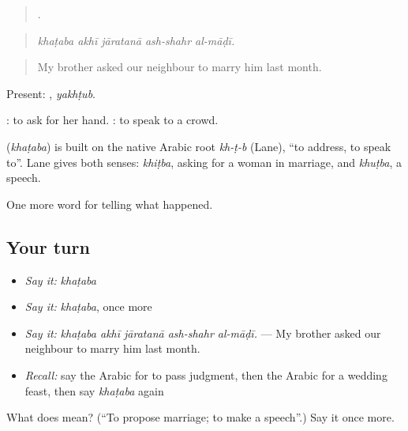 \begin{quote}
    .
\end{quote}

\begin{quote}
\emph{khaṭaba akhī jāratanā ash-shahr al-māḍī.}
\end{quote}

\begin{quote}
My brother asked our neighbour to marry him last month.
\end{quote}

Present: , \emph{yakhṭub}.

 : to ask for her hand.   : to speak to a crowd.

\begin{cousinweb}
\textbf{} (\emph{khaṭaba}) is built on the native Arabic root \emph{kh-ṭ-b} (Lane), \textquotedblleft{}to address, to speak to\textquotedblright{}. Lane gives both senses: \emph{khiṭba}, asking for a woman in marriage, and \emph{khuṭba}, a speech.
\end{cousinweb}

\begin{grammarlens}[title={What you've built}]
One more word for telling what happened.
\end{grammarlens}

\subsection*{Your turn}
\begin{itemize}
\raggedright
  \item \emph{Say it:} \emph{khaṭaba}
  \item \emph{Say it:} \emph{khaṭaba}, once more
  \item \emph{Say it:} \emph{khaṭaba akhī jāratanā ash-shahr al-māḍī.} — My brother asked our neighbour to marry him last month.
  \item \emph{Recall:} say the Arabic for to pass judgment, then the Arabic for a wedding feast, then say \emph{khaṭaba} again
\end{itemize}

\begin{tcolorbox}[breakable,colback=teal!4,colframe=teal!35!black,title={Before you move on}]
What does  mean? (\textquotedblleft{}To propose marriage; to make a speech\textquotedblright{}.) Say it once more.
\end{tcolorbox}
